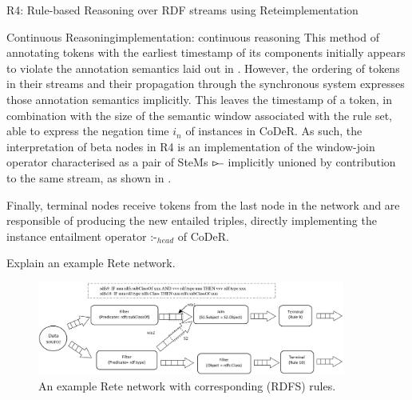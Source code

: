 \begin{nestedsection}{R4: Rule-based Reasoning over RDF streams using Rete}{implementation}
\begin{nestedsection}{Continuous Reasoning}{implementation: continuous reasoning}
		This method of annotating tokens with the earliest timestamp of its components initially appears to violate the annotation semantics laid out in .
		However, the ordering of tokens in their streams and their propagation through the synchronous system expresses those annotation semantics implicitly.
		This leaves the timestamp of a token, in combination with the size of the semantic window associated with the rule set, able to express the negation time $i_n$ of instances in CoDeR.
		As such, the interpretation of beta nodes in R4 is an implementation of the window-join operator characterised as a pair of SteMs $\rstreamjoin$ implicitly unioned by contribution to the same stream, as shown in .

 		Finally, terminal nodes receive tokens from the last node in the network and are responsible of producing the new entailed triples, directly implementing the instance entailment operator $\text{:-}_{head}$ of CoDeR.

 		Explain an example Rete network.

 		\begin{figure}[t]
 			\centering
 			\includegraphics[width=0.9\textwidth]{example-rete-network.png}
 			\caption{An example Rete network with corresponding (RDFS) rules.}
 		\end{figure}
	\end{nestedsection}
\end{nestedsection}
